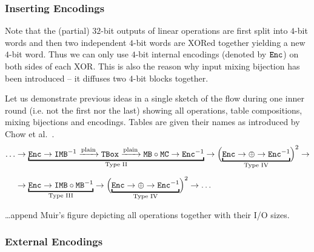 \subsubsection{Inserting Encodings}
	
	Note that the (partial) $32$-bit outputs of linear operations are first split into $4$-bit words and then two independent $4$-bit words are XORed together yielding a new $4$-bit word. Thus we can only use $4$-bit internal encodings (denoted by $\texttt{Enc}$) on both sides of each XOR. This is also the reason why input mixing bijection has been introduced -- it diffuses two $4$-bit blocks together.
	
	Let us demonstrate previous ideas in a single sketch of the flow during one inner round (i.e. not the first nor the last) showing all operations, table compositions, mixing bijections and encodings. Tables are given their names as introduced by Chow et al.\ \cite{chow2003aes}.
	\begin{align}
		\ldots&\rarr\underbracket{\Enc\rarr\IMB^{-1}\xrightarrow{\textnormal{plain}}\TBox\xrightarrow{\textnormal{plain}}\MB\circ\MC\rarr\Enc^{-1}}_{\textnormal{Type II}}\rarr\Bigl(\underbracket{\Enc\rarr\xor\rarr\Enc^{-1}}_{\textnormal{Type IV}}\Bigr)^2\rarr\nonumber\\[.5em]
		&\rarr\underbracket{\Enc\rarr\IMB\circ\MB^{-1}}_{\textnormal{Type III}}\rarr\Bigl(\underbracket{\Enc\rarr\xor\rarr\Enc^{-1}}_{\textnormal{Type IV}}\Bigr)^2\rarr\ldots
	\end{align}
	
	\ldots append Muir's figure depicting all operations together with their I/O sizes.

\subsubsection{External Encodings}
	

